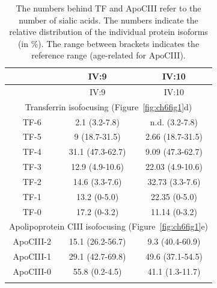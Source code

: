 \clearpage

\footnotesize
\begin{longtable}[c]{c c c}
\caption{\textbf{Quantification of Transferrin-IEF and ApoCIII-IEF bands}} \\
      & IV:9 & IV:10 \\
     \hline
     \endfirsthead
      & IV:9 & IV:10 \\
    \hline
    \endhead
    \multicolumn{3}{c}{Transferrin isofocusing (Figure~\ref{fig:ch6fig1}d)} \\
    TF-6 & 2.1 (3.2-7.8) & n.d. (3.2-7.8) \\
    TF-5 & 9 (18.7-31.5) & 2.66 (18.7-31.5) \\
    TF-4 & 31.1 (47.3-62.7) & 9.09 (47.3-62.7) \\
    TF-3 & 12.9 (4.9-10.6) & 22.03 (4.9-10.6) \\
    TF-2 & 14.6 (3.3-7.6) & 32.73 (3.3-7.6) \\
    TF-1 & 13.2 (0-5.0) & 22.35 (0-5.0) \\
    TF-0 & 17.2 (0-3.2) & 11.14 (0-3.2) \\
    \hline
    \multicolumn{3}{c}{Apolipoprotein CIII isofocusing (Figure~\ref{fig:ch6fig1}e)} \\
    ApoCIII-2 & 15.1 (26.2-56.7) & 9.3 (40.4-60.9) \\
    ApoCIII-1 & 29.1 (42.7-69.8) & 49.6 (37.1-54.5) \\
    ApoCIII-0 & 55.8 (0.2-4.5) & 41.1 (1.3-11.7) \\
    \caption*{The numbers behind TF and ApoCIII refer to the number of sialic acids. The numbers indicate the relative distribution of the individual protein isoforms (in \%). The range between brackets indicates the reference range (age-related for ApoCIII).}
    \label{tbl:ch6tbl2}
\end{longtable}

\clearpage

